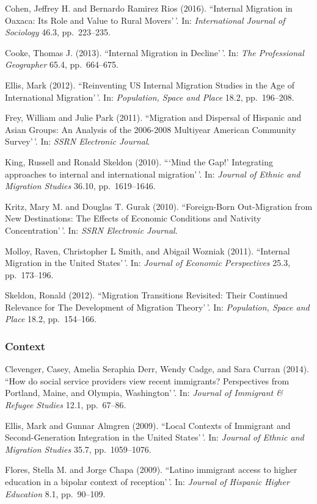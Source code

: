 \documentclass[11pt,]{article}
\begin{document}
Cohen, Jeffrey H. and Bernardo Ramirez Rios (2016). ``Internal Migration
in Oaxaca: Its Role and Value to Rural Movers'\,'. In:
\emph{International Journal of Sociology} 46.3, pp.~223--235.

Cooke, Thomas J. (2013). ``Internal Migration in Decline'\,'. In:
\emph{The Professional Geographer} 65.4, pp.~664--675.

Ellis, Mark (2012). ``Reinventing US Internal Migration Studies in the
Age of International Migration'\,'. In:
\emph{Population, Space and Place} 18.2, pp.~196--208.

Frey, William and Julie Park (2011). ``Migration and Dispersal of
Hispanic and Asian Groups: An Analysis of the 2006-2008 Multiyear
American Community Survey'\,'. In: \emph{SSRN Electronic Journal}.

King, Russell and Ronald Skeldon (2010). ```Mind the Gap!' Integrating
approaches to internal and international migration'\,'. In:
\emph{Journal of Ethnic and Migration Studies} 36.10, pp.~1619--1646.

Kritz, Mary M. and Douglas T. Gurak (2010). ``Foreign-Born Out-Migration
from New Destinations: The Effects of Economic Conditions and Nativity
Concentration'\,'. In: \emph{SSRN Electronic Journal}.

Molloy, Raven, Christopher L Smith, and Abigail Wozniak (2011).
``Internal Migration in the United States'\,'. In:
\emph{Journal of Economic Perspectives} 25.3, pp.~173--196.

Skeldon, Ronald (2012). ``Migration Transitions Revisited: Their
Continued Relevance for The Development of Migration Theory'\,'. In:
\emph{Population, Space and Place} 18.2, pp.~154--166.

\hypertarget{context}{%
\subsubsection{Context}\label{context}}

Clevenger, Casey, Amelia Seraphia Derr, Wendy Cadge, and Sara Curran
(2014). ``How do social service providers view recent immigrants?
Perspectives from Portland, Maine, and Olympia, Washington'\,'. In:
\emph{Journal of Immigrant \& Refugee Studies} 12.1, pp.~67--86.

Ellis, Mark and Gunnar Almgren (2009). ``Local Contexts of Immigrant and
Second-Generation Integration in the United States'\,'. In:
\emph{Journal of Ethnic and Migration Studies} 35.7, pp.~1059--1076.

Flores, Stella M. and Jorge Chapa (2009). ``Latino immigrant access to
higher education in a bipolar context of reception'\,'. In:
\emph{Journal of Hispanic Higher Education} 8.1, pp.~90--109.
\end{document}

